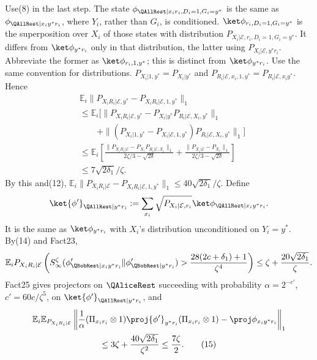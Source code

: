 Use(8) in the last step. The state $\phi_{\QAllRest|x_ir_i,D_i=1,G_i=y^*}$ is the same as $\phi_{\QAllRest|x_iy^*r_i}$, where $Y_i$, rather than $G_i$, is conditioned. $\ket\phi_{r_i,D_i=1,G_i=y^*}$ is the superposition over $X_i$ of those states with distribution $P_{X_i|\mathcal E,r_i,D_i=1,G_i=y^*}$. It differs from $\ket\phi_{y^*r_i}$ only in that distribution, the latter using $P_{X_i|\mathcal E,y^*r_i}$. Abbreviate the former as $\ket\phi_{r_i,1,y^*}$; this is distinct from $\ket\phi_{y^*r_i}$. Use the same convention for distributions.
$P_{X_i|1,y^*}=P_{X_i|y^*}$ and $P_{R_i|\mathcal E,x_i,1,y^*}=P_{R_i|\mathcal E,x_iy^*}$. Hence
\begin{align*}&\mathbb E_i\|P_{X_iR_i|\mathcal E,y^*}-P_{X_iR_i|\mathcal E,1,y^*}\|_1\\&\le\mathbb E_i[\|P_{X_iR_i|\mathcal E,y^*}-P_{X_i|y^*}P_{R_i|\mathcal E,X_i,y^*}\|_1\\&\qquad+\|(P_{X_i|1,y^*}-P_{X_i|\mathcal E,1,y^*})P_{R_i|\mathcal E,X_i,y^*}\|_1]\\&\le\mathbb E_i\left[\frac{\|P_{X_iR_i|\mathcal E}-P_{X_i}P_{R_i|\mathcal E,X_i}\|_1}{2\zeta/3-\sqrt{2\delta}}+\frac{\|P_{X_i|\mathcal E}-P_{X_i}\|_1}{2\zeta/3-\sqrt{2\delta}}\right]\\&\le7\sqrt{2\delta_1}/\zeta.
\end{align*}
By this and(12), $\mathbb E_i\|P_{X_iR_i|\mathcal E}-P_{X_iR_i|\mathcal E,1,y^*}\|_1\le40\sqrt{2\delta_1}/\zeta$.
Define
\[\ket{\phi'}_{\QAllRest|y^*r_i}:=\sum_{x_i}\sqrt{P_{X_i|\mathcal E,r_i}}\ket\phi_{\QAllRest|x_iy^*r_i}.\]
It is the same as $\ket\phi_{y^*r_i}$ with $X_i$'s distribution unconditioned on $Y_i=y^*$. By(14) and Fact23,
\[\mathbb E_iP_{X_iR_i|\mathcal E}\left(S_\infty^\zeta(\phi'_{\QBobRest|x_iy^*r_i}\|\phi'_{\QBobRest|y^*r_i})>\frac{28(2c+\delta_1)+1}{\zeta^4}\right)\le\zeta+\frac{20\sqrt{2\delta_1}}\zeta.\]
Fact25 gives projectors on $\QAliceRest$ succeeding with probability $\alpha=2^{-c'}$, $c'=60c/\zeta^5$, on $\ket{\phi'}_{\QAllRest|y^*r_i}$, and
\begin{multline*}\mathbb E_i\mathbb E_{P_{X_iR_i|\mathcal E}}\left\|\frac1\alpha(\Pi_{x_ir_i}\otimes1)\proj{\phi'}_{y^*r_i}(\Pi_{x_ir_i}\otimes1)-\proj\phi_{x_iy^*r_i}\right\|_1\\\le3\zeta+\frac{40\sqrt{2\delta_1}}{\zeta^2}\le\frac{7\zeta}2.\tag{15}\end{multline*}
